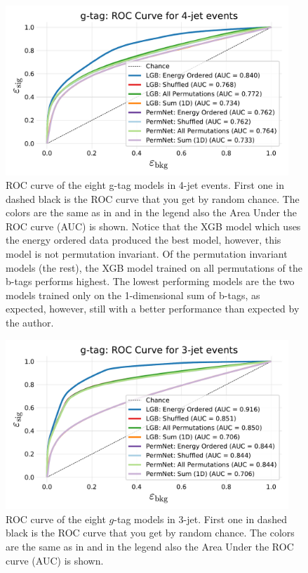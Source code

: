 \begin{figure}
  \includegraphics[width=0.95\textwidth, trim=10 10 10 40, clip]{figures/quarks/gtag_ROC_4_jet-down_sample=1.00-ML_vars=vertex-selection=b-ejet_min=4-n_iter_RS_lgb=99-n_iter_RS_xgb=9-cdot_cut=0.90-version=19.pdf}
  \caption[ROC curve for g-tag in 4-jet events]
          {ROC curve of the eight g-tag models in 4-jet events. First one in dashed black is the ROC curve that you get by random chance. The colors are the same as in  and in the legend also the Area Under the ROC curve (AUC) is shown. 
          Notice that the XGB model which uses the energy ordered data produced the best model, however, this model is not permutation invariant. Of the permutation invariant models (the rest), the XGB model trained on all permutations of the b-tags performs highest. The lowest performing models are the two models trained only on the 1-dimensional sum of b-tags, as expected, however, still with a better performance than expected by the author.  
          } 
  \label{fig:q:roc_gtag_4j}
\end{figure}


\begin{figure}
    \includegraphics[width=0.95\textwidth, trim=10 10 10 40, clip]{figures/quarks/gtag_ROC_3_jet-down_sample=1.00-ML_vars=vertex-selection=b-ejet_min=4-n_iter_RS_lgb=99-n_iter_RS_xgb=9-cdot_cut=0.90-version=19.pdf}
    \caption[ROC Curve for $g$-Tag in 3-Jet Events]
            {ROC curve of the eight $g$-tag models in 3-jet. First one in dashed black is the ROC curve that you get by random chance. The colors are the same as in  and in the legend also the Area Under the ROC curve (AUC) is shown.} 
    \label{fig:q:roc_gtag_3j}
  \end{figure}




